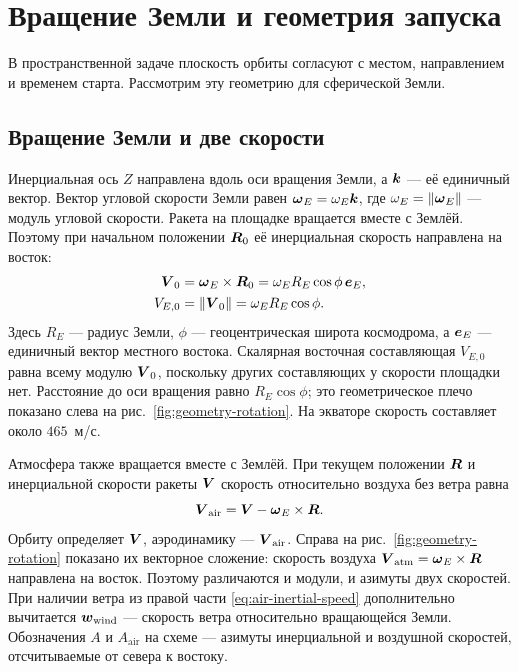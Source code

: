 \section{Вращение Земли и геометрия запуска}
\label{sec:launch-geometry}

В пространственной задаче плоскость орбиты согласуют с местом,
направлением и временем старта. Рассмотрим эту геометрию
для сферической Земли.

\subsection{Вращение Земли и две скорости}

Инерциальная ось $Z$ направлена вдоль оси вращения Земли,
а $\boldsymbol{k}$ --- её единичный вектор.
Вектор угловой скорости Земли равен
$\boldsymbol{\omega}_E=\omega_E\boldsymbol{k}$, где $\omega_E=\left\lVert\boldsymbol{\omega}_E\right\rVert$
--- модуль угловой скорости.
Ракета на площадке вращается вместе с Землёй. Поэтому при начальном
положении $\boldsymbol{R}_0$ её инерциальная скорость направлена на восток:
\begin{equation}
\begin{aligned}
 \boldsymbol{V}_0&=\boldsymbol{\omega}_E\times\boldsymbol{R}_0
          =\omega_E R_E\cos\phi\,\boldsymbol{e}_E,\\
 V_{E,0}&=\left\lVert\boldsymbol{V}_0\right\rVert=\omega_E R_E\cos\phi.
\end{aligned}
\label{eq:launch-initial-velocity}
\end{equation}
Здесь $R_E$ --- радиус Земли, $\phi$ --- геоцентрическая широта
космодрома, а $\boldsymbol{e}_E$ --- единичный вектор местного востока.
Скалярная восточная составляющая $V_{E,0}$ равна всему модулю
$\boldsymbol{V}_0$, поскольку других составляющих у скорости площадки нет.
Расстояние до оси вращения равно $R_E\cos\phi$;
это геометрическое плечо показано слева
на рис.~\ref{fig:geometry-rotation}. На экваторе скорость составляет
около $465$~м/с.

Атмосфера также вращается вместе с Землёй. При текущем положении
$\boldsymbol{R}$ и инерциальной скорости ракеты $\boldsymbol{V}$ скорость
относительно воздуха без ветра равна
\begin{equation}
 \boldsymbol{V}_{\mathrm{air}}=\boldsymbol{V}-\boldsymbol{\omega}_E\times\boldsymbol{R}.
 \label{eq:air-inertial-speed}
\end{equation}
Орбиту определяет $\boldsymbol{V}$, аэродинамику --- $\boldsymbol{V}_{\mathrm{air}}$.
Справа на рис.~\ref{fig:geometry-rotation} показано их векторное сложение:
скорость воздуха $\boldsymbol{V}_{\mathrm{atm}}=\boldsymbol{\omega}_E\times\boldsymbol{R}$
направлена на восток. Поэтому различаются и модули, и азимуты
двух скоростей. При наличии ветра из правой части
\eqref{eq:air-inertial-speed} дополнительно вычитается
$\boldsymbol{w}_{\mathrm{wind}}$ --- скорость ветра относительно вращающейся Земли.
Обозначения $A$ и $A_{\mathrm{air}}$ на схеме --- азимуты
инерциальной и воздушной скоростей, отсчитываемые от севера к востоку.

